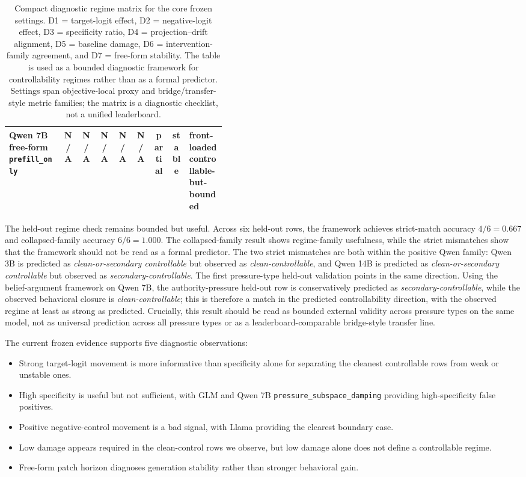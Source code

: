 \documentclass[11pt]{article}
\newcommand{\metric}[1]{\texttt{#1}}
\begin{document}
\begin{table}[t]
{\begin{tabular}{L{0.25\linewidth} c c c c c c c L{0.17\linewidth}}
    Qwen 7B free-form \texttt{prefill\_only} & N/A & N/A & N/A & N/A & N/A & partial & stable & front-loaded controllable-but-bounded \\
    \bottomrule
  \end{tabular}
  }
  \caption{Compact diagnostic regime matrix for the core frozen settings. D1 = target-logit effect, D2 = negative-logit effect, D3 = specificity ratio, D4 = projection--drift alignment, D5 = baseline damage, D6 = intervention-family agreement, and D7 = free-form stability. The table is used as a bounded diagnostic framework for controllability regimes rather than as a formal predictor. Settings span objective-local proxy and bridge/transfer-style metric families; the matrix is a diagnostic checklist, not a unified leaderboard.}
  \label{tab:diagnostic-matrix}
\end{table}

The held-out regime check remains bounded but useful.
Across six held-out rows, the framework achieves strict-match accuracy \(4/6 = 0.667\) and collapsed-family accuracy \(6/6 = 1.000\).
The collapsed-family result shows regime-family usefulness, while the strict mismatches show that the framework should not be read as a formal predictor.
The two strict mismatches are both within the positive Qwen family: Qwen 3B is predicted as \emph{clean-or-secondary controllable} but observed as \emph{clean-controllable}, and Qwen 14B is predicted as \emph{clean-or-secondary controllable} but observed as \emph{secondary-controllable}.
The first pressure-type held-out validation points in the same direction.
Using the belief-argument framework on Qwen 7B, the authority-pressure held-out row is conservatively predicted as \emph{secondary-controllable}, while the observed behavioral closure is \emph{clean-controllable}; this is therefore a match in the predicted controllability direction, with the observed regime at least as strong as predicted.
Crucially, this result should be read as bounded external validity across pressure types on the same model, not as universal prediction across all pressure types or as a leaderboard-comparable bridge-style transfer line.

The current frozen evidence supports five diagnostic observations:
\begin{itemize}
  \item Strong target-logit movement is more informative than specificity alone for separating the cleanest controllable rows from weak or unstable ones.
  \item High specificity is useful but not sufficient, with GLM and Qwen 7B \metric{pressure\_subspace\_damping} providing high-specificity false positives.
  \item Positive negative-control movement is a bad signal, with Llama providing the clearest boundary case.
  \item Low damage appears required in the clean-control rows we observe, but low damage alone does not define a controllable regime.
  \item Free-form patch horizon diagnoses generation stability rather than stronger behavioral gain.
\end{itemize}
\end{document}
